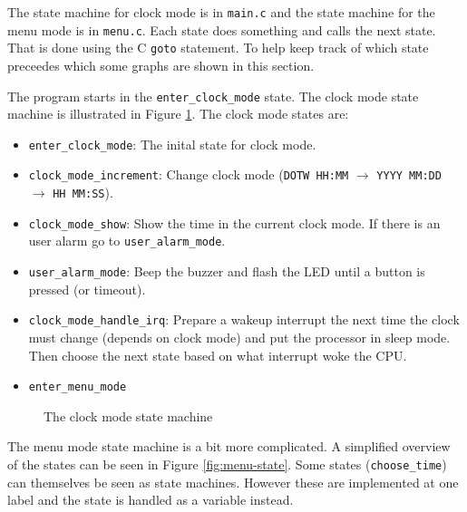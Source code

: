 \documentclass{awac02}
\begin{document}
The state machine for clock mode is in \texttt{main.c} and the state machine
for the menu mode is in \texttt{menu.c}. 
Each state does something and calls the next state.
That is done using the C \texttt{goto} statement.
To help keep track of which state preceedes which some graphs are shown in this
section.

The program starts in the
\texttt{enter\_clock\_mode} state. The clock mode state machine is illustrated
in Figure \ref{fig:clock-state}.
The clock mode states are:
\begin{itemize}
    \item \texttt{enter\_clock\_mode}: The inital state for clock mode.
    \item \texttt{clock\_mode\_increment}: Change clock mode (\texttt{DOTW
            HH:MM} $\to$ \texttt{YYYY MM:DD} $\to$ \texttt{HH MM:SS}).
    \item \texttt{clock\_mode\_show}: Show the time in the current clock mode.
        If there is an user alarm go to \texttt{user\_alarm\_mode}.
    \item \texttt{user\_alarm\_mode}: Beep the buzzer and flash the LED until
        a button is pressed (or timeout).
    \item \texttt{clock\_mode\_handle\_irq}: Prepare a wakeup interrupt the
        next time the clock must change (depends on clock mode) and put the
        processor in sleep mode. Then choose the next state based on what
        interrupt woke the CPU.
    \item \texttt{enter\_menu\_mode}
\end{itemize}

\begin{figure}[h]
    \centering
    
    \caption{The clock mode state machine}
    \label{fig:clock-state}
\end{figure}

The menu mode state machine is a bit more complicated. A simplified overview of
the states can be seen in Figure \ref{fig:menu-state}.
Some states (\texttt{choose\_time}) can themselves be seen as state machines.
However these are implemented at one label and the state is handled as a
variable instead.
\end{document}

